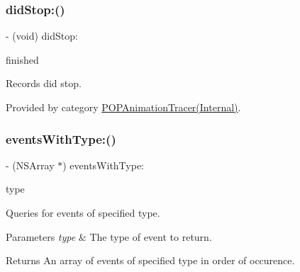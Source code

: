 \subsubsection{\texorpdfstring{did\+Stop\+:()}{didStop:()}\hspace{0.1cm}{\footnotesize\ttfamily [2/2]}}
{\footnotesize\ttfamily -\/ (void) did\+Stop\+: \begin{DoxyParamCaption}\item[{(B\+O\+OL)}]{finished }\end{DoxyParamCaption}}

Records did stop. 

Provided by category \mbox{\hyperlink{category_p_o_p_animation_tracer_07_internal_08_aa97d51350238303c671157f782583a9b}{P\+O\+P\+Animation\+Tracer(\+Internal)}}.

\mbox{\label{interface_p_o_p_animation_tracer_a6a7fd2d3ca93d8cfeea745e51e2bad04}} 
\subsubsection{\texorpdfstring{events\+With\+Type\+:()}{eventsWithType:()}\hspace{0.1cm}{\footnotesize\ttfamily [1/3]}}
{\footnotesize\ttfamily -\/ (N\+S\+Array $\ast$) events\+With\+Type\+: \begin{DoxyParamCaption}\item[{(P\+O\+P\+Animation\+Event\+Type)}]{type }\end{DoxyParamCaption}}

Queries for events of specified type. 
\begin{DoxyParams}{Parameters}
{\em type} & The type of event to return. \\
\hline
\end{DoxyParams}
\begin{DoxyReturn}{Returns}
An array of events of specified type in order of occurence. 
\end{DoxyReturn}
\mbox{\label{interface_p_o_p_animation_tracer_a6a7fd2d3ca93d8cfeea745e51e2bad04}} 
